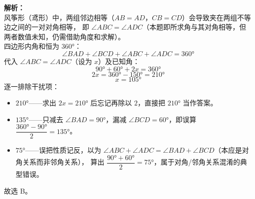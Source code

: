 \documentclass[12pt,a4paper]{exam-zh}
\begin{document}
\begin{solution}
    \textbf{解析：} \\
    风筝形（鸢形）中，两组邻边相等（$AB=AD$，$CB=CD$）会导致夹在两组不等边之间的一对对角相等，
    即 $\angle ABC = \angle ADC$（本题即所求角与其对角相等，但两者数值未知，仍需借助角度和求解）。 \\
    四边形内角和恒为 $360°$：
    \[ \displaystyle \angle BAD + \angle BCD + \angle ABC + \angle ADC = 360° \]
    代入 $\angle ABC = \angle ADC$（设为 $x$）及已知角：
    \[ \displaystyle 90° + 60° + 2x = 360° \]
    \[ \displaystyle 2x = 360° - 150° = 210° \]
    \[ \displaystyle x = 105° \]
    逐一排除干扰项：
    \begin{itemize}
        \item[D.] $210°$——求出 $2x=210°$ 后忘记再除以 $2$，直接把 $210°$ 当作答案。
        \item[C.] $135°$——只减去 $\angle BAD=90°$，漏减 $\angle BCD=60°$，即误算 $\dfrac{360°-90°}{2}=135°$。
        \item[A.] $75°$——误把性质记反，以为 $\angle ABC+\angle ADC = \angle BAD+\angle BCD$（本应是对角关系而非邻角关系），
        算出 $\dfrac{90°+60°}{2}=75°$，属于对角/邻角关系混淆的典型错误。
    \end{itemize}
    故选 B。
\end{solution}

\end{document}
